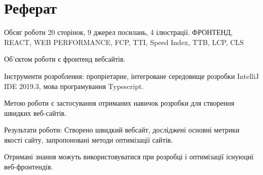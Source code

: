 \newpage
\section*{Реферат}
\label{sec:referat}
Обсяг роботи 20 сторінок, 9 джерел посилань, 4 ілюстрації.
ФРОНТЕНД, REACT, WEB PERFORMANCE, FCP, TTI, Speed Index, TTB, LCP, CLS

Об’єктом роботи є фронтенд вебсайтів.

Інструменти розроблення: пропріетарне, інтегроване середовище розробки IntelliJ IDE 2019.3, мова програмування Typescript.

Метою роботи є застосування отриманих навичок розробки для створення швидких веб-сайтів.

Результати роботи: Створено швидкий вебсайт, досліджені основні метрики якості сайту, запропоновані методи оптимізації
сайтів.

Отримані знання можуть використовуватися при розробці і оптимізації існуюциї веб-фронтендів.

